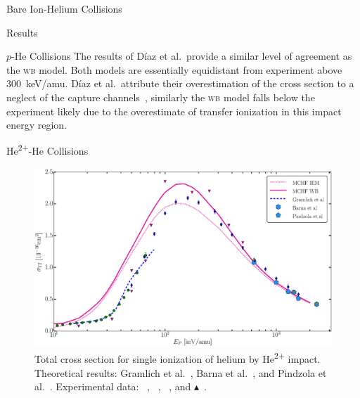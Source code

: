 \documentclass[letterpaper, 11 pt]{report}
\begin{document}
\begin{chapter}{Bare Ion-Helium Collisions \label{chap:p-he2p-he}}
\begin{section}{Results \label{sec:phe2p-res}}
\begin{subsection}{\texorpdfstring{$p$}{p}-He Collisions \label{sec:phe-res}}
         The results of D\'{i}az et al.\ provide a similar level of agreement as the \textsc{wb} model.
         Both models are essentially equidistant from experiment above 300~keV/amu. D\'{i}az
         et al.\ attribute their overestimation of the cross section to a neglect of the
         capture channels~\cite{DMS-00}, similarly the \textsc{wb} model falls below the experiment
         likely due to the overestimate of transfer ionization in this impact energy region.

      \end{subsection}

      \begin{subsection}{\texorpdfstring{He\textsuperscript{2+}}{He2+}-He Collisions
                         \label{sec:he2phe-res}}

         \begin{figure}[t]
            \centering
            \includegraphics[width = 0.95 \linewidth]{./images/he2phe/he2phe-TI.eps}
            \caption[Total cross section for single ionization of helium by He\textsuperscript{2+}
                     impact.]{Total cross section for single ionization of helium by
                     He\textsuperscript{2+} impact. Theoretical results: Gramlich
                     et al.~\cite{GGS-89}, Barna
                     et al.~\cite{BTB-05}, and Pindzola et al.~\cite{PRC-07}.
                     Experimental data: {\color{blue}{$\blacklozenge$}}~\cite{SG85},
                     {\color{OliveGreen}{$\bullet$}}~\cite{SG89},
                     {\color{RedViolet}{$\blacktriangledown$}}~\cite{Dubois87}, and
                     {\color{GreenYellow}$\blacktriangle$}~\cite{KAH84}. \label{fig:he2phe-ti}}
         \end{figure}


\end{subsection}
\end{section}
\end{chapter}
\end{document}
